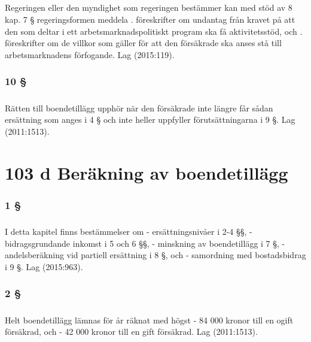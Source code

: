 \documentclass[a4paper,notitlepage,openany,10pt]{book}
\begin{document}
\paragraph*{}
Regeringen eller den myndighet som regeringen bestämmer kan med stöd av 8 kap. 7 § regeringsformen meddela
. föreskrifter om undantag från kravet på att den som deltar i ett arbetsmarknadspolitiskt program ska få aktivitetsstöd, och
. föreskrifter om de villkor som gäller för att den försäkrade ska anses stå till arbetsmarknadens förfogande.
Lag (2015:119).
\subsection*{10 §}
\paragraph*{}
Rätten till boendetillägg upphör när den försäkrade inte längre får sådan ersättning som anges i 4 § och inte heller uppfyller förutsättningarna i 9 §.
Lag (2011:1513).
\chapter*{103 d Beräkning av boendetillägg}
\subsection*{1 §}
\paragraph*{}
I detta kapitel finns bestämmelser om
\newline - ersättningsnivåer i 2-4 §§,
\newline - bidragsgrundande inkomst i 5 och 6 §§,
\newline - minskning av boendetillägg i 7 §,
\newline - andelsberäkning vid partiell ersättning i 8 §, och
\newline - samordning med bostadsbidrag i 9 §.
Lag (2015:963).
\subsection*{2 §}
\paragraph*{}
Helt boendetillägg lämnas för år räknat med högst
\newline - 84 000 kronor till en ogift försäkrad, och
\newline - 42 000 kronor till en gift försäkrad.
Lag (2011:1513).
\end{document}
